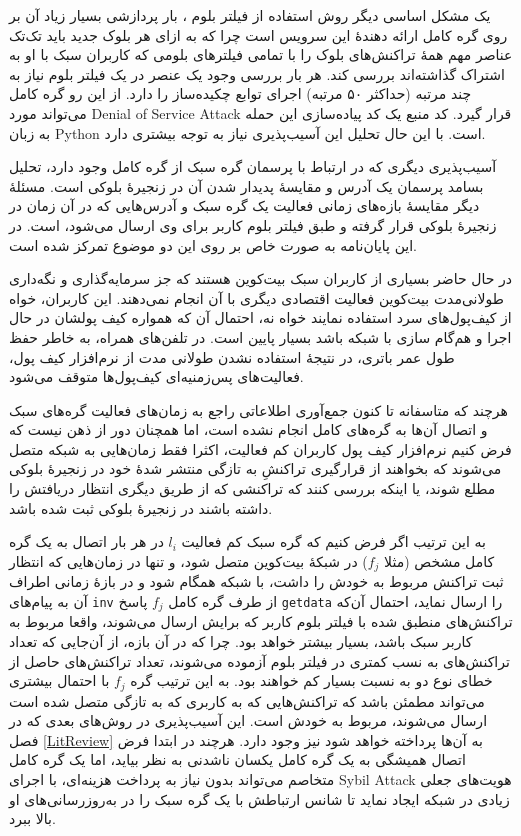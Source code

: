 یک مشکل اساسی دیگر روش استفاده از فیلتر بلوم \cite{Hearn2013}، بار پردازشی بسیار زیاد آن بر روی گره کامل ارائه دهندهٔ این سرویس است چرا که به ازای هر بلوک جدید باید تک‌تک عناصر مهم همهٔ تراکنش‌های بلوک را با تمامی فیلتر‌های بلومی که کاربران سبک با او به اشتراک گذاشته‌اند بررسی کند. هر بار بررسی وجود یک عنصر در یک فیلتر بلوم نیاز به چند مرتبه (حداکثر ۵۰ مرتبه) اجرای توابع چکیده‌ساز را دارد. از این رو گره کامل می‌تواند مورد 
\gls{Denial of Service Attack}
قرار گیرد. کد منبع \cite{PeterTodd} یک کد پیاده‌سازی این حمله به زبان 
\gls{Python}
است. با این حال تحلیل این آسیب‌پذیری نیاز به توجه بیشتری دارد.

آسیب‌پذیری دیگری که در ارتباط با پرسمان‌ گره سبک از گره کامل وجود دارد، تحلیل بسامد پرسمان یک آدرس  و مقایسهٔ پدیدار شدن آن در زنجیرهٔ بلوکی است. مسئلهٔ دیگر مقایسهٔ بازه‌های زمانی فعالیت یک گره سبک و آدرس‌هایی که در آن زمان در زنجیرهٔ بلوکی قرار گرفته و طبق فیلتر بلوم کاربر برای وی ارسال می‌شود، است. در این پایان‌نامه به صورت خاص بر روی این دو موضوع تمرکز شده است. 

در حال حاضر بسیاری از کاربران سبک بیت‌کوین هستند که جز سرمایه‌گذاری و نگه‌داری طولانی‌مدت بیت‌کوین فعالیت اقتصادی دیگری با آن انجام نمی‌دهند. این کاربران، خواه از کیف‌پول‌های سرد استفاده نمایند خواه نه، احتمال آن که همواره کیف پولشان در حال اجرا و هم‌گام سازی با شبکه باشد بسیار پایین است. در تلفن‌های همراه، به خاطر حفظ طول عمر باتری، در نتیجهٔ استفاده نشدن طولانی مدت از نرم‌افزار کیف پول، فعالیت‌‌های پس‌زمنیه‌‌ای کیف‌پول‌ها متوقف می‌شود.  

هرچند که متاسفانه تا کنون جمع‌آوری اطلاعاتی راجع به زمان‌های فعالیت گره‌های سبک و اتصال آن‌ها به گره‌های کامل انجام نشده است، اما همچنان دور از ذهن نیست که فرض کنیم نرم‌افزار کیف پول کاربران کم فعالیت، اکثرا فقط زمان‌هایی به شبکه متصل می‌شوند که بخواهند از قرارگیری تراکنشِ به تازگی منتشر شدهٔ خود در زنجیرهٔ بلوکی مطلع شوند، یا اینکه بررسی کنند که تراکنشی که از طریق دیگری انتظار دریافتش را داشته باشند در زنجیرهٔ بلوکی ثبت شده باشد. 

به این ترتیب اگر فرض کنیم که گره سبک کم فعالیت $l_i$ در هر بار اتصال به یک گره کامل مشخص (مثلا $f_j$) در شبکهٔ بیت‌کوین  متصل شود، و تنها در زمان‌هایی که انتظار ثبت تراکنش مربوط به خودش را داشت، با شبکه همگام شود و در بازهٔ زمانی اطراف آن به پیام‌های \texttt{inv} از طرف گره کامل $f_j$ پاسخ‌ \texttt{getdata} را ارسال نماید، احتمال آن‌که تراکنش‌های منطبق شده با فیلتر بلوم کاربر که برایش ارسال می‌شوند، واقعا مربوط به کاربر سبک باشد، بسیار بیشتر خواهد بود. چرا که در آن بازه، از آن‌جایی که  تعداد تراکنش‌های به نسب کمتری در فیلتر بلوم آزموده می‌شوند،‌ تعداد تراکنش‌های حاصل از خطای نوع دو به نسبت بسیار کم خواهند بود. به این ترتیب گره $f_j$ با احتمال بیشتری می‌تواند مطمئن باشد که تراکنش‌هایی که به کاربری که به تازگی متصل شده است ارسال می‌شوند، مربوط به خودش است.  این آسیب‌پذیری در روش‌های بعدی که در فصل \ref{LitReview} به آن‌ها پرداخته خواهد شود نیز وجود دارد. هرچند در ابتدا فرض اتصال همیشگی به یک گره کامل یکسان ناشدنی به نظر بیاید، اما یک گره کامل متخاصم می‌تواند بدون نیاز به پرداخت هزینه‌ای، با اجرای 
\gls{Sybil Attack}
هویت‌های جعلی زیادی در شبکه ایجاد نماید تا شانس ارتباطش با یک گره سبک را در به‌روزرسانی‌های او بالا ببرد. 

